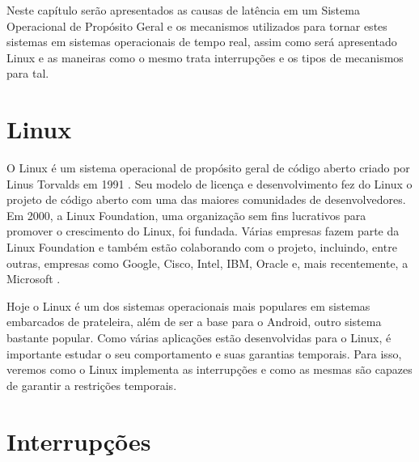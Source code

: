 \label{cap2}

Neste capítulo serão apresentados as causas de latência em um Sistema Operacional de Propósito Geral e os mecanismos utilizados para tornar estes sistemas em sistemas operacionais de tempo real, assim como será apresentado Linux e as maneiras como o mesmo trata interrupções e os tipos de mecanismos para tal.

\section{Linux}

O Linux é um sistema operacional de propósito geral de código aberto criado por Linus Torvalds em 1991 \cite{LinuxRelease}. Seu modelo de licença e desenvolvimento fez do Linux o projeto de código aberto com uma das maiores comunidades de desenvolvedores. Em 2000, a Linux Foundation, uma organização sem fins lucrativos para promover o crescimento do Linux, foi fundada. Várias empresas fazem parte da Linux Foundation e também estão colaborando com o projeto, incluindo, entre outras, empresas como Google, Cisco, Intel, IBM, Oracle e, mais recentemente, a Microsoft \cite{LinuxFoundation}. 

Hoje o Linux é um dos sistemas operacionais mais populares em sistemas embarcados de prateleira, além de ser a base para o Android, outro sistema bastante popular. Como várias aplicações estão desenvolvidas para o Linux, é importante estudar o seu comportamento e suas garantias temporais. Para isso, veremos como o Linux implementa as interrupções e como as mesmas são capazes de garantir a restrições temporais.

\section{Interrupções}

